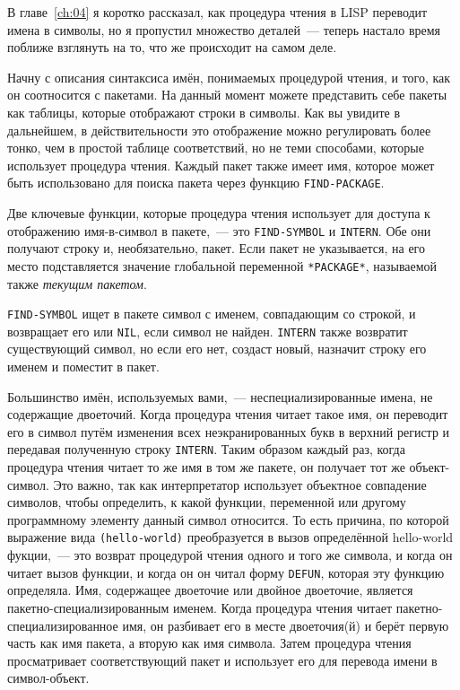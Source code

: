 В главе~\ref{ch:04} я коротко рассказал, как процедура чтения в LISP переводит имена в символы,
но я пропустил множество деталей~--- теперь настало время поближе взглянуть на то, что же
происходит на самом деле.

Начну с описания синтаксиса имён, понимаемых процедурой чтения, и того, как он соотносится с
пакетами.  На данный момент можете представить себе пакеты как таблицы, которые
отображают строки в символы. Как вы увидите в дальнейшем, в действительности это
отображение можно регулировать более тонко, чем в простой таблице соответствий, но не теми
способами, которые использует процедура чтения. Каждый пакет также имеет имя, которое может
быть использовано для поиска пакета через функцию \lstinline{FIND-PACKAGE}.

Две ключевые функции, которые процедура чтения использует для доступа к отображению
имя-в-символ в пакете,~--- это \lstinline{FIND-SYMBOL} и \lstinline{INTERN}. Обе они получают строку и,
необязательно, пакет.  Если пакет не указывается, на его место подставляется значение
глобальной переменной \lstinline{*PACKAGE*}, называемой также \textit{текущим пакетом}.

\lstinline{FIND-SYMBOL} ищет в пакете символ с именем, совпадающим со строкой, и возвращает его
или \lstinline{NIL}, если символ не найден. \lstinline{INTERN} также возвратит существующий символ,
но если его нет, создаст новый, назначит строку его именем и поместит в пакет.

Большинство имён, используемых вами,~--- неспециализированные имена, не содержащие
двоеточий. Когда процедура чтения читает такое имя, он переводит его в символ путём изменения
всех неэкранированных букв в верхний регистр и передавая полученную строку \lstinline{INTERN}.
Таким образом каждый раз, когда процедура чтения читает то же имя в том же пакете, он получает
тот же объект-символ. Это важно, так как интерпретатор использует объектное совпадение
символов, чтобы определить, к какой функции, переменной или другому программному элементу
данный символ относится. То есть причина, по которой выражение вида \lstinline{(hello-world)}
преобразуется в вызов определённой hello-world фукции,~--- это возврат процедурой чтения одного и
того же символа, и когда он читает вызов функции, и когда он он читал форму \lstinline{DEFUN},
которая эту функцию определяла.  Имя, содержащее двоеточие или двойное двоеточие, является
пакетно-специализированным именем. Когда процедура чтения читает пакетно-специализированное
имя, он разбивает его в месте двоеточия(й) и берёт первую часть как имя пакета, а вторую
как имя символа.  Затем процедура чтения просматривает соответствующий пакет и использует его
для перевода имени в символ-объект.

